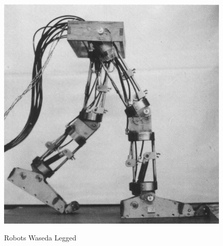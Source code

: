 \begin{figure}[H]
{\includegraphics[scale=0.5]{imagenes/apartado_2/29_2_WL_3_1969}}
\caption{Robots Waseda Legged \cite{ref34}}
\label{figura29}
\end{figure}

